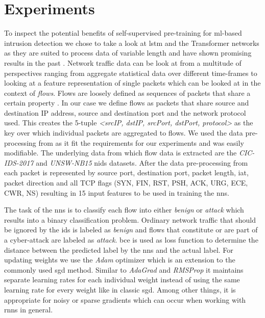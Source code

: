 \chapter{Experiments}\label{sec:experiments}

To inspect the potential benefits of self-supervised pre-training for \gls{ml}-based intrusion detection we chose to take a look at \gls{lstm} and the Transformer networks as they are suited to process data of variable length and have shown promising results in the past . Network traffic data can be look at from a multitude of perspectives ranging from aggregate statistical data over different time-frames \cite{kitsune} to looking at a feature representation of single packets which can be looked at in the context of \textit{flows}. Flows are loosely defined as sequences of packets that share a certain property \cite{adversarial_recurrent_ids}. In our case we define flows as packets that share source and destination IP address, source and destination port and the network protocol used. This creates the 5-tuple \textit{<srcIP, dstIP, srcPort, dstPort, protocol>} as the key over which individual packets are aggregated to flows. We used the data pre-processing from \cite{adversarial_recurrent_ids} as it fit the requirements for our experiments and was easily modifiable. The underlying data from which flow data is extracted are the \textit{CIC-IDS-2017} \cite{cic_ids_2017} and \textit{UNSW-NB15} \cite{unsw_nb15} \gls{nids} datasets. After the data pre-processing from \cite{adversarial_recurrent_ids} each packet is represented by source port, destination port, packet length, \gls{iat}, packet direction and all TCP flags (SYN, FIN, RST, PSH, ACK, URG, ECE, CWR, NS) resulting in 15 input features to be used in training the \glspl{nn}. \par

The task of the \glspl{nn} is to classify each flow into either \textit{benign} or \textit{attack} which results into a binary classification problem. Ordinary network traffic that should be ignored by the \gls{ids} is labeled as \textit{benign} and flows that constitute or are part of a cyber-attack are labeled as \textit{attack}. \gls{bce} is used as loss function to determine the distance between the predicted label by the \glspl{nn} and the actual label. For updating weights we use the \textit{Adam} optimizer \cite{adam} which is an extension to the commonly used \gls{sgd} method. Similar to \textit{AdaGrad} \cite{optimizer_comparison} and \textit{RMSProp} \cite{optimizer_comparison} it maintains separate learning rates for each individual weight instead of using the same learning rate for every weight like in classic \gls{sgd}. Among other things, it is appropriate for noisy or sparse gradients which can occur when working with \glspl{rnn} in general.

